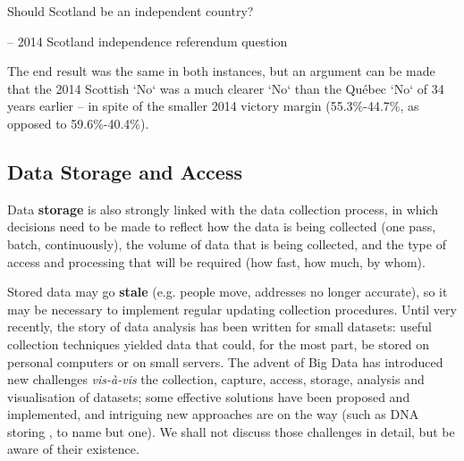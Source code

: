\begin{tcolorbox}[title=Do You Think They Learned Something From 1980?]
Should Scotland be an independent country? \\[-0.6cm]
\begin{flushright}
-- 2014 Scotland independence referendum question
\end{flushright}
\end{tcolorbox}
\noindent The end result was the same in both instances, but an argument can be made that the 2014 Scottish `No` was a much clearer `No` than the Qu\'ebec `No` of 34 years earlier -- in spite of the smaller 2014 victory margin (55.3\%-44.7\%, as opposed to 59.6\%-40.4\%). 
\subsection{Data Storage and Access}
Data \textbf{storage} is also strongly linked with the data collection process, in which decisions need to be made to reflect how the data is being collected (one pass, batch, continuously), the volume of data that is being collected, and the type of access and processing that will be required (how fast, how much, by whom).\par Stored data may go \textbf{stale} (e.g. people move, addresses no longer accurate), so it may be necessary to implement regular updating collection procedures. 
\newl 
Until very recently, the story of data analysis has been written for small datasets: useful collection techniques yielded data that could, for the most part, be stored on personal computers or on small servers. The advent of Big Data has introduced new challenges \textit{vis-\`a-vis} the collection, capture, access, storage, analysis and visualisation of datasets; some effective solutions have been proposed and implemented, and intriguing new approaches are on the way (such as DNA storing \cite{DC_DNA}, to name but one). We shall not discuss those challenges in detail, but be aware of their existence.  
